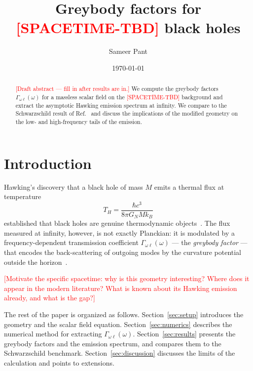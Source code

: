 \documentclass[
  aps,
  prd,
  preprint,      %
  superscriptaddress,
  nofootinbib,
  amsmath,
  amssymb,
  floatfix,
]{revtex4-2}
\newcommand{\GN}{G_{\!N}}
\begin{document}
\title{Greybody factors for \textbf{\textcolor{red}{[SPACETIME-TBD]}} black holes}

\author{Sameer Pant}

\date{\today}

\begin{abstract}
\textcolor{red}{[Draft abstract --- fill in after results are in.]}
We compute the greybody factors $\Gamma_{\omega\ell}(\omega)$ for a massless
scalar field on the \textcolor{red}{[SPACETIME-TBD]} background and extract the
asymptotic Hawking emission spectrum at infinity. We compare to the
Schwarzschild result of Ref.~\cite{Page1976} and discuss the implications of
the modified geometry on the low- and high-frequency tails of the emission.
\end{abstract}

\maketitle

\section{Introduction}
\label{sec:intro}

Hawking's discovery that a black hole of mass $M$ emits a thermal flux at
temperature
\begin{equation}
  T_H = \frac{\hbar c^3}{8\pi \GN M k_B}
  \label{eq:hawking-temp}
\end{equation}
established that black holes are genuine thermodynamic objects~\cite{Hawking1975,
BardeenCarterHawking1973}. The flux measured at infinity, however, is not
exactly Planckian: it is modulated by a frequency-dependent transmission
coefficient $\Gamma_{\omega\ell}(\omega)$ --- the \emph{greybody factor} ---
that encodes the back-scattering of outgoing modes by the curvature potential
outside the horizon~\cite{Page1976}.

\textcolor{red}{[Motivate the specific spacetime: why is this geometry
interesting? Where does it appear in the modern literature? What is known
about its Hawking emission already, and what is the gap?]}

The rest of the paper is organized as follows.
Section~\ref{sec:setup} introduces the geometry and the scalar field equation.
Section~\ref{sec:numerics} describes the numerical method for extracting
$\Gamma_{\omega\ell}(\omega)$.
Section~\ref{sec:results} presents the greybody factors and the emission
spectrum, and compares them to the Schwarzschild benchmark.
Section~\ref{sec:discussion} discusses the limits of the calculation and
points to extensions.
\end{document}
